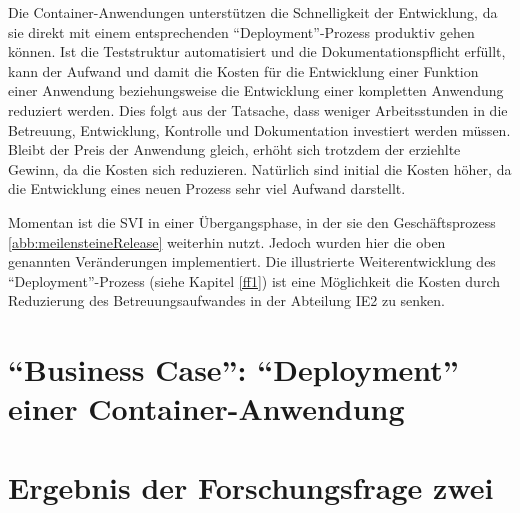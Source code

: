 \par
Die Container-Anwendungen unterstützen die Schnelligkeit der Entwicklung, da sie direkt mit einem entsprechenden \enquote{Deployment}-Prozess produktiv gehen können. Ist die Teststruktur automatisiert und die Dokumentationspflicht erfüllt, kann der Aufwand und damit die Kosten für die Entwicklung einer Funktion einer Anwendung beziehungsweise die Entwicklung einer kompletten Anwendung reduziert werden. Dies folgt aus der Tatsache, dass weniger Arbeitsstunden in die Betreuung, Entwicklung, Kontrolle und Dokumentation investiert werden müssen. Bleibt der Preis der Anwendung gleich, erhöht sich trotzdem der erziehlte Gewinn, da die Kosten sich reduzieren. Natürlich sind initial die Kosten höher, da die Entwicklung eines neuen Prozess sehr viel Aufwand darstellt.
\par
Momentan ist die \ac{SVI} in einer Übergangsphase, in der sie den Geschäftsprozess \vref{abb:meilensteineRelease} weiterhin nutzt. Jedoch wurden hier die oben genannten Veränderungen implementiert. Die illustrierte Weiterentwicklung des \enquote{Deployment}-Prozess (siehe Kapitel \vref{ff1}) ist eine Möglichkeit die Kosten durch Reduzierung des Betreuungsaufwandes in der Abteilung \ac{IE2} zu senken.

\section{\enquote{Business Case}: \enquote{Deployment} einer Container-Anwendung}


\section{Ergebnis der Forschungsfrage zwei}
